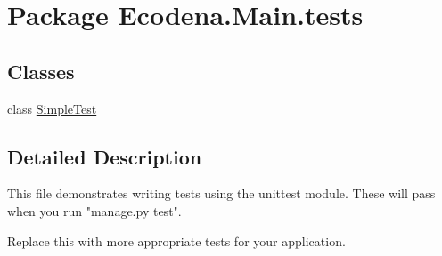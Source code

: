 \hypertarget{namespace_ecodena_1_1_main_1_1tests}{
\section{Package Ecodena.Main.tests}
\label{d8/ddf/namespace_ecodena_1_1_main_1_1tests}
}
\subsection*{Classes}
\begin{DoxyCompactItemize}
\item 
class \hyperlink{class_ecodena_1_1_main_1_1tests_1_1_simple_test}{SimpleTest}
\end{DoxyCompactItemize}


\subsection{Detailed Description}
\begin{DoxyVerb}
This file demonstrates writing tests using the unittest module. These will pass
when you run "manage.py test".

Replace this with more appropriate tests for your application.
\end{DoxyVerb}
 